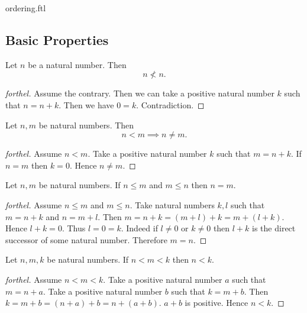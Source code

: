 \documentclass{naproche-library}
\begin{document}
\begin{smodule}{ordering.ftl}
  \subsection*{Basic Properties}

  \begin{proposition}[forthel,id=ARITHMETIC_04_1037693395927040]
    Let $n$ be a natural number.
    Then \[ n \nless n. \]
  \end{proposition}
  \begin{proof}[forthel]
    Assume the contrary.
    Then we can take a positive natural number $k$ such that $n = n + k$.
    Then we have $0 = k$.
    Contradiction.
  \end{proof}

  \begin{proposition}[forthel,id=ARITHMETIC_04_8266284905005056]
    Let $n, m$ be natural numbers.
    Then \[ n < m \implies n \neq m. \]
  \end{proposition}
  \begin{proof}[forthel]
    Assume $n < m$.
    Take a positive natural number $k$ such that $m = n + k$.
    If $n = m$ then $k = 0$.
    Hence $n \neq m$.
  \end{proof}

  \begin{proposition}[forthel,id=ARITHMETIC_04_4190604718243840]
    Let $n, m$ be natural numbers.
    If $n \leq m$ and $m \leq n$ then $n = m$.
  \end{proposition}
  \begin{proof}[forthel]
    Assume $n \leq m$ and $m \leq n$.
    Take natural numbers $k, l$ such that $m = n + k$ and $n = m + l$.
    Then $m
      = n + k
      = (m + l) + k
      = m + (l + k)$.
    Hence $l + k = 0$.
    Thus $l = 0 = k$.
    Indeed if $l \neq 0$ or $k \neq 0$ then $l + k$ is the direct successor of
    some natural number.
    Therefore $m = n$.
  \end{proof}

  \begin{proposition}[forthel,id=ARITHMETIC_04_6413905244979200]
    Let $n, m, k$ be natural numbers.
    If $n < m < k$ then $n < k$.
  \end{proposition}
  \begin{proof}[forthel]
    Assume $n < m < k$.
    Take a positive natural number $a$ such that $m = n + a$.
    Take a positive natural number $b$ such that $k = m + b$.
    Then $k
      = m + b
      = (n + a) + b
      = n + (a + b)$.
    $a + b$ is positive.
    Hence $n < k$.
  \end{proof}


\end{smodule}
\end{document}
